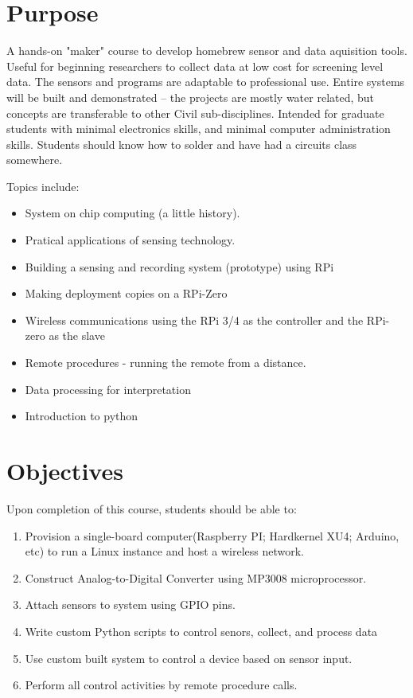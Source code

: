 \documentclass[12pt]{article}
\begin{document}
\section*{Purpose}
A hands-on "maker" course to develop homebrew sensor and data aquisition tools. 
Useful for beginning researchers to collect data at low cost for screening level data.
The sensors and programs are adaptable to professional use.  
Entire systems will be built and demonstrated -- the projects are mostly water related, but concepts are transferable to other Civil sub-disciplines.
Intended for graduate students with minimal electronics skills, and minimal computer administration skills.
Students should know how to solder and have had a circuits class somewhere.

Topics include:
\begin{itemize}
\item System on chip computing (a little history). 
\item         Pratical applications of sensing technology.
\item         Building a sensing and recording system (prototype) using RPi
 \item        Making deployment copies on a RPi-Zero 
\item         Wireless communications using the RPi 3/4 as the controller and the RPi-zero as the slave
 \item        Remote procedures - running the remote from a distance.
 \item        Data processing for interpretation
\item         Introduction to python
\end{itemize}

\section*{Objectives}
Upon completion of this course, students should be able to:
\begin{enumerate}
\item Provision a single-board computer(Raspberry PI; Hardkernel XU4; Arduino, etc) to run a Linux instance and host a wireless network.
\item Construct Analog-to-Digital Converter using MP3008 microprocessor.
\item Attach sensors to system using GPIO pins.
\item Write custom Python scripts to control senors, collect, and process data
\item Use custom built system to control a device based on sensor input.
\item Perform all control activities by remote procedure calls.
\end{enumerate}
\end{document}
